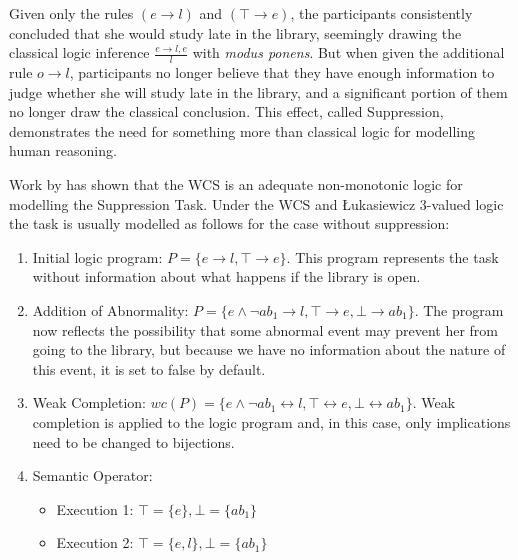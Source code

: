 \documentclass{article}
\begin{document}
Given only the rules $(e \rightarrow l)$ and $(\top \rightarrow e)$, the participants consistently concluded that she would study late in the library, seemingly drawing the classical logic inference $\frac{e \rightarrow l, e}{l}$ with \textit{modus ponens}. But when given the additional rule $o\rightarrow l$, participants no longer believe that they have enough information to judge whether she will study late in the library, and a significant portion of them no longer draw the classical conclusion. This effect, called Suppression, demonstrates the need for something more than classical logic for modelling human reasoning.

Work by \cite{dietz2014modeling} has shown that the WCS is an adequate non-monotonic logic for modelling the Suppression Task. Under the WCS and \L ukasiewicz 3-valued logic the task is usually modelled as follows for the case without suppression:
\begin{enumerate}
\item Initial logic program: $P = \{e \rightarrow l, \top \rightarrow e \}$. This program represents the task without information about what happens if the library is open.
\item Addition of Abnormality: $P = \{e \land \lnot ab_1 \rightarrow l, \top \rightarrow e, \bot \rightarrow ab_1 \}$. The program now reflects the possibility that some abnormal event may prevent her from going to the library, but because we have no information about the nature of this event, it is set to false by default.
\item Weak Completion: $wc(P) = \{e \land \lnot ab_1 \leftrightarrow l, \top \leftrightarrow e, \bot \leftrightarrow ab_1 \}$. Weak completion is applied to the logic program and, in this case, only implications need to be changed to bijections.
\item Semantic Operator:
\begin{itemize}
\item Execution 1: $\top=\{e\}, \bot=\{ab_1\}$
\item Execution 2: $\top=\{e,l\}, \bot=\{ab_1\}$
\end{itemize}
\end{enumerate}
\end{document}

